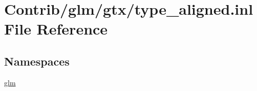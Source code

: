 \hypertarget{type__aligned_8inl}{}\section{Contrib/glm/gtx/type\+\_\+aligned.inl File Reference}
\label{type__aligned_8inl}
\subsection*{Namespaces}
\begin{DoxyCompactItemize}
\item 
 \mbox{\hyperlink{namespaceglm}{glm}}
\end{DoxyCompactItemize}
